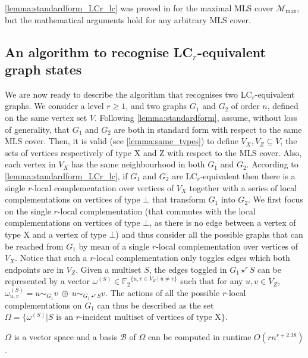 \documentclass[a4paper,UKenglish,cleveref,autoref,thm-restate]{arxiv}
\newcommand{\se}{\subseteq}
\newcommand{\gs}{\geqslant}
\begin{document}
\cref{lemma:standardform_LCr_lc} was proved in \cite{claudet2024local} for the maximal MLS cover $\mathcal M_\text{max}$, but the mathematical arguments hold for any arbitrary MLS cover. 


\subsection{An algorithm to recognise \texorpdfstring{LC$_r$}{LCr}-equivalent graph states} \label{subsec:algorithm_lcr}



We are now ready to describe the algorithm that recognises two LC$_r$-equivalent graphs. We consider a level $r \gs 1$, and two graphs $G_1$ and $G_2$ of order $n$, defined on the same vertex set $V$. Following \cref{lemma:standardform}, assume, without loss of generality, that $G_1$ and $G_2$ are both in standard form with respect to the same MLS cover. Then, it is valid (see \cref{lemma:same_types}) to define $V_X, V_Z \se V$, the sets of vertices respectively of type X and Z with respect to the MLS cover. Also, each vertex in $V_X$ has the same neighbourhood in both $G_1$ and $G_2$. According to \cref{lemma:standardform_LCr_lc}, if $G_1$ and $G_2$ are LC$_r$-equivalent then there is a single $r$-local complementation over vertices of $V_X$ together with a series of local complementations on vertices of type $\bot$ that transform $G_1$ into $G_2$. We first focus on the single $r$-local complementation (that commutes with the local complementations on vertices of type $\bot$, as there is no edge between a vertex of type X and a vertex of type $\bot$) and thus consider all the possible graphs that can be reached from $G_1$ by mean of a single $r$-local complementation over vertices of $V_X$. 
Notice that such a $r$-local complementation only toggles edges which both endpoints are in $V_Z$. Given a multiset $S$, the edges toggled in $G_1\star^r S$ can be represented by a vector $\omega^{(S)}\in {{\mathbb F}_2}^{\{u,v \in V_Z ~|~ u \neq v\}}$ such that for any $u,v \in V_Z$, $\omega^{(S)}_{u,v} = u\sim_{G_1} v ~\oplus~ u\sim_{G_1\star^r S} v$. The actions of all the possible $r$-local complementations on $G_1$ can thus be described as the set $\Omega =\{\omega^{(S)}  |  \text{$S$ is an $r$-incident multiset of vertices of type X}\}$. 


\begin{lemma} \label{lemma:omega}
    $\Omega$ is a vector space and a basis $\mathcal B$ of $\Omega$ can be computed in runtime $O(r n^{r+2.38})$.
\end{lemma}
\end{document}
